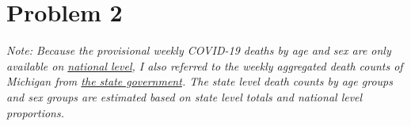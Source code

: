 \documentclass[12pt]{article}
\begin{document}
\section*{Problem 2}
\emph{Note: Because the provisional weekly COVID-19 deaths by age and sex are only available on \href{https://data.cdc.gov/NCHS/Provisional-COVID-19-Deaths-by-Week-Sex-and-Age/vsak-wrfu}{national level}, I also referred to the weekly aggregated death counts of Michigan from \href{https://www.michigan.gov/coronavirus/-/media/Project/Websites/coronavirus/Michigan-Data/10-04-2022/Datasets/Cases-and-Deaths-by-County-and-by-Date-of-Symptom-Onset-or-by-Date-of-Death2022-10-04.xlsx?rev=d9568cd19a45423aac6c03af0ce87707&hash=EF2BBF61BD1BFFB0E9F20527E91DCC47}{the state government}. The state level death counts by age groups and sex groups are estimated based on state level totals and national level proportions.}  
\end{document}

